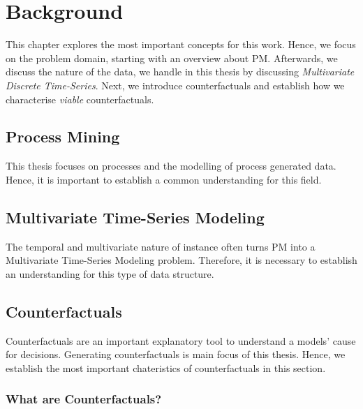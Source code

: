 \documentclass[12pt,a4paper]{report}
\begin{document}

\chapter{Background}
\label{ch:prereq}
This chapter explores the most important concepts for this work. Hence, we focus on the problem domain, starting with an overview about \Gls{PM}. Afterwards, we discuss the nature of the data, we handle in this thesis by discussing \emph{Multivariate Discrete Time-Series}. Next, we introduce counterfactuals and establish how we characterise \emph{viable} counterfactuals. 

\section{Process Mining}
\label{sec:process}
This thesis focuses on processes and the modelling of process generated data. Hence, it is important to establish a common understanding for this field.


\section{Multivariate Time-Series Modeling}
\label{sec:sequences}
The temporal and multivariate nature of \gls{instance} often turns \Gls{PM} into a Multivariate Time-Series Modeling problem. Therefore, it is necessary to establish an understanding for this type of data structure.



\section{Counterfactuals}
\label{sec:counterfactuals}
Counterfactuals are an important explanatory tool to understand a models' cause for decisions. Generating counterfactuals is main focus of this thesis. Hence, we establish the most important chateristics of counterfactuals in this section.

\subsection{What are Counterfactuals?}


% 
\end{document}
